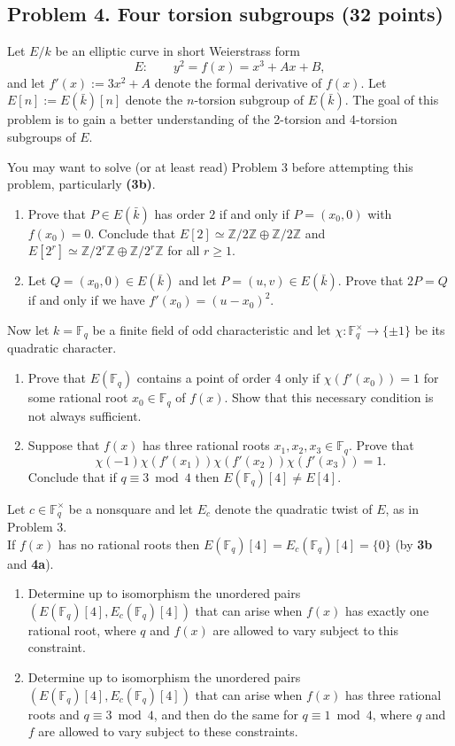 \documentclass[11pt]{article}
\newcommand{\Fq}{\mathbb{F}_q}
\newcommand{\Z}{\mathbb{Z}}
\newcommand{\kbar}{\bar{k}}
\begin{document}
\subsection*{Problem 4.  Four torsion subgroups (32 points)}
Let $E/k$ be an elliptic curve in short Weierstrass form
\[
E\colon\qquad y^2 = f(x) = x^3 + Ax +B,
\]
and let $f'(x):=3x^2+A$ denote the formal derivative of $f(x)$.  Let $E[n]:=E(\kbar)[n]$ denote the $n$-torsion subgroup of $E(\kbar)$.  The goal of this problem is to gain a better understanding of the 2-torsion and 4-torsion subgroups of $E$.

You may want to solve (or at least read) Problem 3 before attempting this problem, particularly \textbf{(3b)}.

\begin{enumerate}
\item[\textbf{(a)}] Prove that $P\in E(\kbar)$ has order $2$ if and only if $P=(x_0,0)$ with $f(x_0)=0$.  Conclude that $E[2]\simeq \Z/2\Z\oplus \Z/2\Z$ and $E[2^r]\simeq \Z/2^r\Z\oplus \Z/2^r\Z$ for all $r\ge 1$.
\item[\textbf{(b)}] Let $Q=(x_0,0)\in E(\kbar)$ and let $P=(u,v)\in E(\kbar)$.  Prove that $2P=Q$ if and only if we have $f'(x_0)=(u-x_0)^2$.
\end{enumerate}

\noindent
Now let $k=\Fq$ be a finite field of odd characteristic and let $\chi\colon \Fq^\times\to\{\pm 1\}$ be its quadratic character.
\begin{enumerate}
\item[\textbf{(c)}] Prove that $E(\Fq)$ contains a point of order 4 only if $\chi(f'(x_0))=1$ for some rational root $x_0\in \Fq$ of $f(x)$.  Show that this necessary condition is not always sufficient.
\item[\textbf{(d)}] Suppose that $f(x)$ has three rational roots $x_1,x_2,x_3\in \Fq$.  Prove that
\[
\chi(-1)\chi(f'(x_1))\chi(f'(x_2))\chi(f'(x_3))=1.
\]
Conclude that if $q\equiv 3\bmod 4$ then $E(\Fq)[4]\ne E[4]$.
\end{enumerate}
Let $c\in \Fq^\times$ be a nonsquare and let $E_c$ denote the quadratic twist of $E$, as in Problem 3.\\
If $f(x)$ has no rational roots then $E(\Fq)[4]=E_c(\Fq)[4]=\{0\}$ (by \textbf{3b} and \textbf{4a}).
\begin{enumerate}
\item[\textbf{(e)}] Determine up to isomorphism the unordered pairs $(E(\Fq)[4],E_c(\Fq)[4])$ that can arise when $f(x)$ has exactly one rational root, where $q$ and $f(x)$ are allowed to vary subject to this constraint.
\item[\textbf{(f)}] Determine up to isomorphism the unordered pairs $(E(\Fq)[4],E_c(\Fq)[4])$ that can arise when $f(x)$ has three rational roots and $q\equiv 3\bmod 4$, and then do the same for $q\equiv 1\bmod 4$, where $q$ and $f$ are allowed to vary subject to these constraints.
\end{enumerate}
\end{document}
